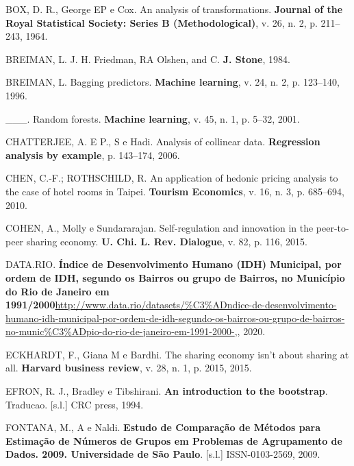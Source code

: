 \documentclass[
	12pt,				%
	a4paper,		%
	oneside,    %
	chapter=TITLE,		   %
	section=TITLE,		   %
	subsection=TITLE,	   %
	subsubsection=TITLE, %
	english,			%
	french,				%
	spanish,			%
	brazil,				%
]{abntex2}
\begin{document}
\leavevmode\hypertarget{ref-box1964analysis}{}%
BOX, D. R., George EP e Cox. An analysis of transformations.
\textbf{Journal of the Royal Statistical Society: Series B
(Methodological)}, v. 26, n. 2, p. 211--243, 1964.

\leavevmode\hypertarget{ref-breiman1984j}{}%
BREIMAN, L. J. H. Friedman, RA Olshen, and C. \textbf{J. Stone}, 1984.

\leavevmode\hypertarget{ref-breiman1996bagging}{}%
BREIMAN, L. Bagging predictors. \textbf{Machine learning}, v. 24, n. 2,
p. 123--140, 1996.

\leavevmode\hypertarget{ref-breiman2001random}{}%
\_\_\_. Random forests. \textbf{Machine learning}, v. 45, n. 1, p.
5--32, 2001.

\leavevmode\hypertarget{ref-chatterjee2006analysis}{}%
CHATTERJEE, A. E P., S e Hadi. Analysis of collinear data.
\textbf{Regression analysis by example}, p. 143--174, 2006.

\leavevmode\hypertarget{ref-chen2010application}{}%
CHEN, C.-F.; ROTHSCHILD, R. An application of hedonic pricing analysis
to the case of hotel rooms in Taipei. \textbf{Tourism Economics}, v. 16,
n. 3, p. 685--694, 2010.

\leavevmode\hypertarget{ref-cohen2015self}{}%
COHEN, A., Molly e Sundararajan. Self-regulation and innovation in the
peer-to-peer sharing economy. \textbf{U. Chi. L. Rev. Dialogue}, v. 82,
p. 116, 2015.

\leavevmode\hypertarget{ref-datario}{}%
DATA.RIO. \textbf{Índice de Desenvolvimento Humano (IDH) Municipal, por
ordem de IDH, segundo os Bairros ou grupo de Bairros, no Município do
Rio de Janeiro em
1991/2000}\url{http://www.data.rio/datasets/\%C3\%ADndice-de-desenvolvimento-humano-idh-municipal-por-ordem-de-idh-segundo-os-bairros-ou-grupo-de-bairros-no-munic\%C3\%ADpio-do-rio-de-janeiro-em-1991-2000-},,
2020.

\leavevmode\hypertarget{ref-eckhardt2015sharing}{}%
ECKHARDT, F., Giana M e Bardhi. The sharing economy isn't about sharing
at all. \textbf{Harvard business review}, v. 28, n. 1, p. 2015, 2015.

\leavevmode\hypertarget{ref-efron1994introduction}{}%
EFRON, R. J., Bradley e Tibshirani. \textbf{An introduction to the
bootstrap}. Traducao. {[}s.l.{]} CRC press, 1994.

\leavevmode\hypertarget{ref-fontanaestudo}{}%
FONTANA, M., A e Naldi. \textbf{Estudo de Comparação de Métodos para
Estimação de Números de Grupos em Problemas de Agrupamento de Dados.
2009. Universidade de São Paulo}. {[}s.l.{]} ISSN-0103-2569, 2009.
\end{document}
